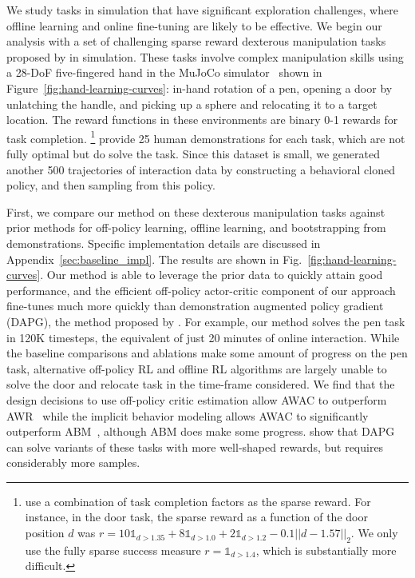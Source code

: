 We study tasks in simulation that have significant exploration challenges, where offline learning and online fine-tuning are likely to be effective. We begin our analysis with a set of challenging sparse reward dexterous manipulation tasks proposed by \citet{rajeswaran2018dextrous} in simulation.
These tasks involve complex manipulation skills using a 28-DoF five-fingered hand in the MuJoCo simulator~\citep{todorov12mujoco} shown in Figure~\ref{fig:hand-learning-curves}: in-hand rotation of a pen, opening a door by unlatching the handle, and picking up a sphere and relocating it to a target location.
The reward functions in these environments are binary 0-1 rewards for task completion. 
\footnote{\citet{rajeswaran2018dextrous} use a combination of task completion factors as the sparse reward. For instance, in the door task, the sparse reward as a function of the door position $d$ was $r = 10\mathds{1}_{d > 1.35} + 8\mathds{1}_{d > 1.0} + 2\mathds{1}_{d > 1.2} - 0.1||d - 1.57||_2$. We only use the fully sparse success measure $r = \mathds{1}_{d > 1.4}$, which is substantially more difficult. } 
\citet{rajeswaran2018dextrous} provide 25 human demonstrations for each task, which are not fully optimal but do solve the task. Since this dataset is small, we generated another 500 trajectories of interaction data by constructing a behavioral cloned policy, and then sampling from this policy.



First, we compare our method on these dexterous manipulation tasks against prior methods for off-policy learning, offline learning, and bootstrapping from demonstrations.
Specific implementation details are discussed in Appendix~\ref{sec:baseline_impl}.
The results are shown in Fig.~\ref{fig:hand-learning-curves}. Our method is able to leverage the prior data to quickly attain good performance, and the efficient off-policy actor-critic component of our approach fine-tunes much more quickly than demonstration augmented policy gradient (DAPG), the method proposed by \citet{rajeswaran2018dextrous}. For example, our method solves the pen task in 120K timesteps, the equivalent of just 20 minutes of online interaction. While the baseline comparisons and ablations make some amount of progress on the pen task, alternative off-policy RL and offline RL algorithms are largely unable to solve the door and relocate task in the time-frame considered. We find that the design decisions to use off-policy critic estimation allow AWAC to outperform AWR~\citep{peng2019awr} while the implicit behavior modeling allows AWAC to significantly outperform ABM~\citep{siegel2020abm}, although ABM does make some progress. \citet{rajeswaran2018dextrous} show that DAPG can solve variants of these tasks with more well-shaped rewards, but requires considerably more samples.

